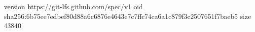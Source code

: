 version https://git-lfs.github.com/spec/v1
oid sha256:6b75ee7edbef80d88a6c6876e4643e7c7ffc74ca6a1c879f3c2507651f7baeb5
size 43840
